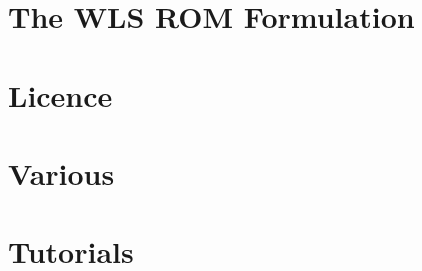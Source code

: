 \let\mypdfximage\pdfximage\def\pdfximage{\immediate\mypdfximage}\documentclass[twoside]{book}
\newcommand{\+}{\discretionary{\mbox{\scriptsize$\hookleftarrow$}}{}{}}
\newcommand{\clearemptydoublepage}{%
  \newpage{\pagestyle{empty}\cleardoublepage}%
}
\begin{document}
\chapter{The WLS ROM Formulation}
\label{md_pages_old_various_formulation_wls}

\chapter{Licence}
\label{md_pages_old_various_license}

\chapter{Various}
\label{md_pages_old_various}

\chapter{Tutorials}
\label{md_pages_tutorials}


\backmatter
\newpage
{}
\clearemptydoublepage
{}
\printindex
\end{document}
